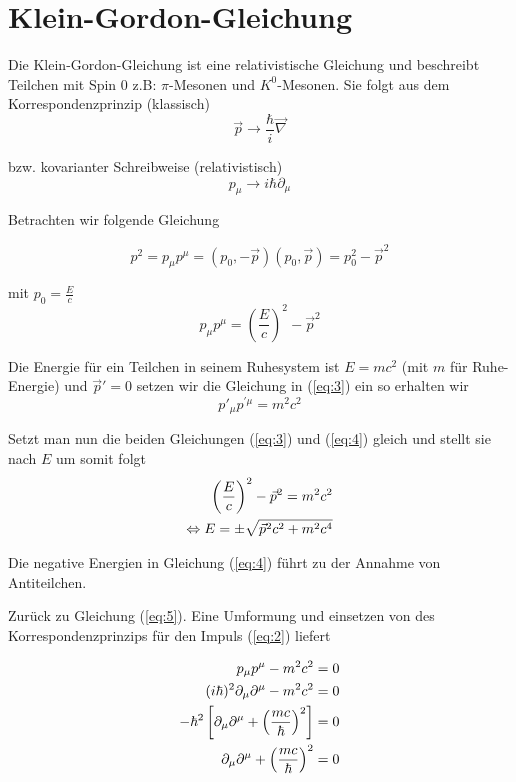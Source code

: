
 



\section*{Klein-Gordon-Gleichung}


Die Klein-Gordon-Gleichung ist eine relativistische Gleichung und beschreibt Teilchen mit Spin 0 z.B: \(\pi\)-Mesonen und \(K^0\)-Mesonen. Sie folgt aus dem Korrespondenzprinzip (klassisch)
\begin{equation}
  \label{eq:1}
  \vec p \rightarrow \frac{\hbar}{i}\vec\nabla 
\end{equation}

bzw. kovarianter Schreibweise (relativistisch)
\begin{equation}
  \label{eq:2}
  p_\mu \rightarrow i\hbar \partial_\mu
\end{equation}

Betrachten wir folgende Gleichung

\[p^2 = p_\mu p^\mu = (p_0,-\vec p) (p_0,\vec p) =  p_0^2 -\vec p^2\]

mit \(p_0 = \frac{E}{c}\) 
\begin{equation}
  \label{eq:3}
  p_\mu p^\mu =  \left( \frac{E}{c}\right)^2 -\vec p^2
\end{equation}


Die Energie für ein Teilchen in seinem Ruhesystem ist \(E=mc^2\) (mit \(m\) für Ruhe-Energie) und \(\vec p' = 0\) setzen wir die Gleichung in (\ref{eq:3}) ein so erhalten wir
\begin{equation}
  \label{eq:5}
   p'_\mu p^{'\mu} = m^2c^2
\end{equation}

Setzt man nun die beiden Gleichungen (\ref{eq:3}) und (\ref{eq:4}) gleich und stellt sie nach \(E\) um somit folgt
\begin{align}
  \label{eq:4}
  \left( \frac{E}{c}\right)^2 -\vec p^2  = m^2c^2 \notag \\
\Leftrightarrow E = \pm \sqrt{\vec p^2c^2 + m^2c^4}
\end{align}

Die negative Energien in Gleichung (\ref{eq:4}) führt zu der Annahme von Antiteilchen.

Zurück zu Gleichung (\ref{eq:5}). Eine Umformung und einsetzen von des Korrespondenzprinzips für den Impuls (\ref{eq:2}) liefert

\begin{align}
  \label{eq:6}
   p_\mu p^\mu - m^2c^2 &= 0 \notag \\
(i\hbar)^2\partial_\mu\partial^\mu -  m^2c^2 &= 0  \notag \\
-\hbar^2\left[\partial_\mu\partial^\mu + \left(\frac{mc}{\hbar}\right)^2  \right] &= 0 \notag \\
\partial_\mu\partial^\mu + \left(\frac{mc}{\hbar}\right)^2  &= 0
\end{align}

